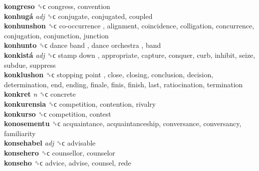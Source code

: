 \textbf{kongreso} ␝ϲ  congress, convention  \\
\textbf{konhugá} \emph{adj}  ␝ϲ  conjugate, conjugated, coupled  \\
\textbf{konhunshon} ␝ϲ   co-occurrence , alignment, coincidence, colligation, concurrence, conjugation, conjunction, junction  \\
\textbf{konhunto} ␝ϲ   dance band ,  dance orchestra , band  \\
\textbf{konkistá} \emph{adj}  ␝ϲ   stamp down , appropriate, capture, conquer, curb, inhibit, seize, subdue, suppress  \\
\textbf{konklushon} ␝ϲ   stopping point , close, closing, conclusion, decision, determination, end, ending, finale, finis, finish, last, ratiocination, termination  \\
\textbf{konkret} \emph{n}  ␝ϲ  concrete  \\
\textbf{konkurensia} ␝ϲ  competition, contention, rivalry  \\
\textbf{konkurso} ␝ϲ  competition, contest  \\
\textbf{konosementu} ␝ϲ  acquaintance, acquaintanceship, conversance, conversancy, familiarity  \\
\textbf{konsehabel} \emph{adj}  ␝ϲ  advisable  \\
\textbf{konsehero} ␝ϲ  counsellor, counselor  \\
\textbf{konseho} ␝ϲ  advice, advise, counsel, rede  \\
